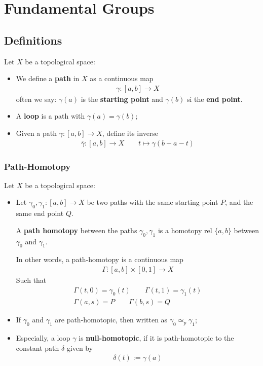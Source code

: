 \documentclass[Total.tex]{subfiles}
\begin{document}
	\chapter{Fundamental Groups}
		\section{Definitions}
			\begin{Def}
				Let $X$ be a topological space:
				\begin{itemize}
					\item We define a \textbf{path} in $X$ as a continuous map
					\begin{gather*}
						\gamma:[a,b]\rightarrow X
					\end{gather*}
					often we say: $\gamma(a)$ is the \textbf{starting point} and $\gamma(b)$ si the \textbf{end point}.
					\item A \textbf{loop} is a path with $\gamma(a)=\gamma(b)$;
					\item Given a path $\gamma:[a,b]\rightarrow X$, define its inverse 
					\begin{gather*}
						\bar{\gamma}:[a,b]\rightarrow X\qquad t\mapsto \gamma(b+a-t)
					\end{gather*}
				\end{itemize}
			\end{Def}
			
			\subsection{Path-Homotopy}
				\begin{Def}
					Let $X$ be a topological space:
					\begin{itemize}
						\item Let $\gamma_0,\gamma_1:[a,b]\rightarrow X$ be two paths with the same starting point $P$, and the same end point $Q$.
						
						A \textbf{path homotopy} between the paths $\gamma_0,\gamma_1$ is a homotopy rel $\{a,b\}$ between $\gamma_0$ and $\gamma_1$.
						
						In other words, a path-homotopy is a continuous map
						\begin{gather*}
							\Gamma:[a,b]\times [0,1]\rightarrow X
						\end{gather*}
						Such that
						\begin{gather*}
							\Gamma(t,0)=\gamma_0(t)\qquad \Gamma(t,1)=\gamma_1(t)\\
							\Gamma(a,s)=P\qquad \Gamma(b,s)=Q
						\end{gather*}
						\item If $\gamma_0$ and $\gamma_1$ are path-homotopic, then written as $\gamma_0\simeq_p \gamma_1$;
						\item Especially, a loop $\gamma$ is \textbf{null-homotopic}, if it is path-homotopic to the constant path $\delta$ given by
						\begin{gather*}
							\delta(t):=\gamma(a)
						\end{gather*}
					\end{itemize}
				\end{Def}
\end{document}
